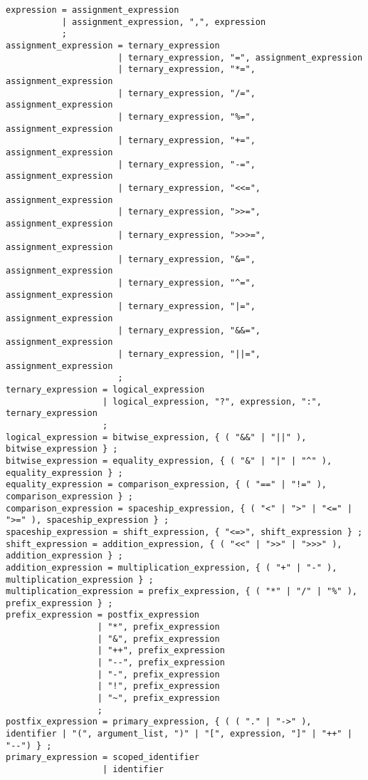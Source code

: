 \documentclass[letterpaper,12pt]{book}
\begin{document}
\begin{lstlisting}[breaklines=true]
expression = assignment_expression
           | assignment_expression, ",", expression
           ;
assignment_expression = ternary_expression
                      | ternary_expression, "=", assignment_expression
                      | ternary_expression, "*=", assignment_expression
                      | ternary_expression, "/=", assignment_expression
                      | ternary_expression, "%=", assignment_expression
                      | ternary_expression, "+=", assignment_expression
                      | ternary_expression, "-=", assignment_expression
                      | ternary_expression, "<<=", assignment_expression
                      | ternary_expression, ">>=", assignment_expression
                      | ternary_expression, ">>>=", assignment_expression
                      | ternary_expression, "&=", assignment_expression
                      | ternary_expression, "^=", assignment_expression
                      | ternary_expression, "|=", assignment_expression
                      | ternary_expression, "&&=", assignment_expression
                      | ternary_expression, "||=", assignment_expression
                      ;
ternary_expression = logical_expression
                   | logical_expression, "?", expression, ":", ternary_expression
                   ;
logical_expression = bitwise_expression, { ( "&&" | "||" ), bitwise_expression } ;
bitwise_expression = equality_expression, { ( "&" | "|" | "^" ), equality_expression } ;
equality_expression = comparison_expression, { ( "==" | "!=" ), comparison_expression } ;
comparison_expression = spaceship_expression, { ( "<" | ">" | "<=" | ">=" ), spaceship_expression } ;
spaceship_expression = shift_expression, { "<=>", shift_expression } ;
shift_expression = addition_expression, { ( "<<" | ">>" | ">>>" ), addition_expression } ;
addition_expression = multiplication_expression, { ( "+" | "-" ), multiplication_expression } ;
multiplication_expression = prefix_expression, { ( "*" | "/" | "%" ), prefix_expression } ;
prefix_expression = postfix_expression
                  | "*", prefix_expression
                  | "&", prefix_expression
                  | "++", prefix_expression
                  | "--", prefix_expression
                  | "-", prefix_expression
                  | "!", prefix_expression
                  | "~", prefix_expression
                  ;
postfix_expression = primary_expression, { ( ( "." | "->" ), identifier | "(", argument_list, ")" | "[", expression, "]" | "++" | "--") } ;
primary_expression = scoped_identifier
                   | identifier

\end{lstlisting}
\end{document}
